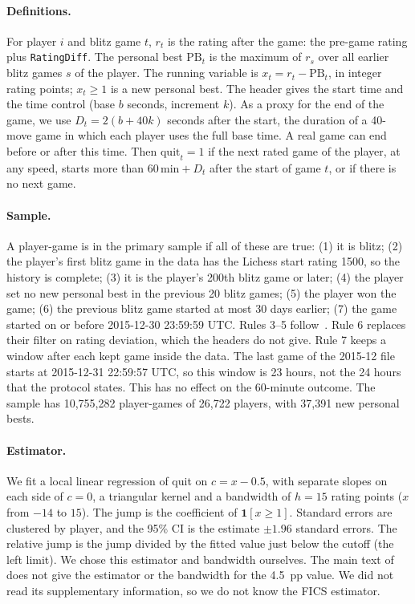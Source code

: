 \documentclass[11pt]{article}
\begin{document}
\paragraph{Definitions.} For player $i$ and blitz game $t$, $r_t$ is the rating after the game: the pre-game rating plus \texttt{RatingDiff}. The personal best $\mathrm{PB}_t$ is the maximum of $r_s$ over all earlier blitz games $s$ of the player. The running variable is $x_t = r_t - \mathrm{PB}_t$, in integer rating points; $x_t \ge 1$ is a new personal best. The header gives the start time and the time control (base $b$ seconds, increment $k$). As a proxy for the end of the game, we use $D_t = 2(b + 40k)$ seconds after the start, the duration of a 40-move game in which each player uses the full base time. A real game can end before or after this time. Then $\mathrm{quit}_t = 1$ if the next rated game of the player, at any speed, starts more than $60\,\mathrm{min} + D_t$ after the start of game $t$, or if there is no next game.

\paragraph{Sample.} A player-game is in the primary sample if all of these are true: (1) it is blitz; (2) the player's first blitz game in the data has the Lichess start rating 1500, so the history is complete; (3) it is the player's 200th blitz game or later; (4) the player set no new personal best in the previous 20 blitz games; (5) the player won the game; (6) the previous blitz game started at most 30 days earlier; (7) the game started on or before 2015-12-30 23:59:59 UTC. Rules 3--5 follow~\cite{ag}. Rule 6 replaces their filter on rating deviation, which the headers do not give. Rule 7 keeps a window after each kept game inside the data. The last game of the 2015-12 file starts at 2015-12-31 22:59:57 UTC, so this window is 23 hours, not the 24 hours that the protocol states. This has no effect on the 60-minute outcome. The sample has 10,755,282 player-games of 26,722 players, with 37,391 new personal bests.

\paragraph{Estimator.} We fit a local linear regression of quit on $c = x - 0.5$, with separate slopes on each side of $c=0$, a triangular kernel and a bandwidth of $h = 15$ rating points ($x$ from $-14$ to $15$). The jump is the coefficient of $\mathbf 1[x \ge 1]$. Standard errors are clustered by player, and the 95\% CI is the estimate $\pm 1.96$ standard errors. The relative jump is the jump divided by the fitted value just below the cutoff (the left limit). We chose this estimator and bandwidth ourselves. The main text of~\cite{ag} does not give the estimator or the bandwidth for the 4.5~pp value. We did not read its supplementary information, so we do not know the FICS estimator.
\end{document}
